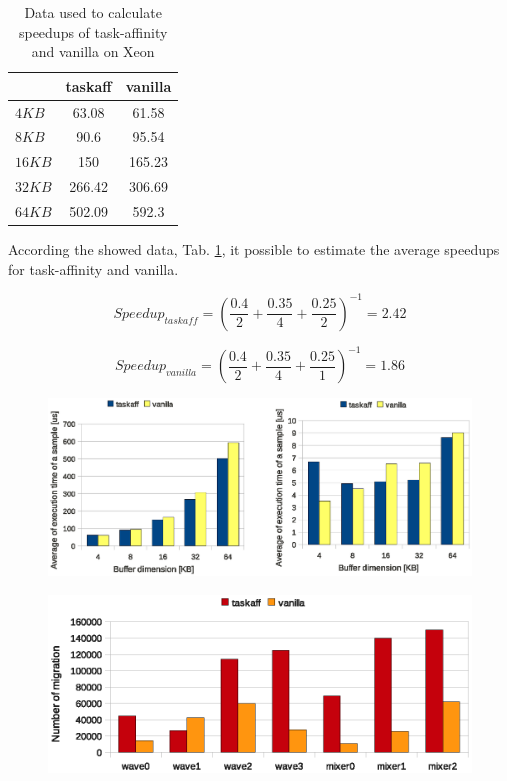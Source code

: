 \begin{table}[tbp]
{
\begin{tabular}{|l|c|c|}
	\hline
	& taskaff & vanilla \\ \hline
	$4KB$ & 63.08 & 61.58 \\ \hline
	$8KB$ & 90.6 & 95.54 \\ \hline
	$16KB$ & 150 & 165.23 \\ \hline
	$32KB$ & 266.42 & 306.69 \\ \hline
	$64KB$ & 502.09 & 592.3 \\ \hline
\end{tabular}
\label{tab:final_time_xeon}
}
\label{tab:final_time_speedup_xeon}
\caption{Data used to calculate speedups of task-affinity and vanilla on Xeon}
\end{table}

According the showed data, Tab. \ref{tab:final_time_speedup_xeon}, it possible to estimate the average speedups for task-affinity and vanilla.

\begin{equation}
  Speedup_{taskaff} = \left( \frac{0.4}{2} + \frac{0.35}{4} + \frac{0.25}{2} \right)^{-1} = 2.42
\label{eq:speedup_xeon_taskaff}
\end{equation}

\begin{equation}
  Speedup_{vanilla} = \left(\frac{0.4}{2} + \frac{0.35}{4} + \frac{0.25}{1} \right)^{-1} = 1.86
\label{eq:speedup_xeon_van}
\end{equation}

\begin{figure}[htbp]
\centering
\includegraphics[width=\widefigure]{images/results_xeon/time_avg_var_Xeon.eps}
\caption{}
\label{fig:time_avg_var_xeon}
\end{figure}

\begin{figure}[htbp]
\centering
\includegraphics[width=\widefigure]{images/results_xeon/migration_xeon.eps}
\caption{}
\label{fig:migration_xeon}
\end{figure}

